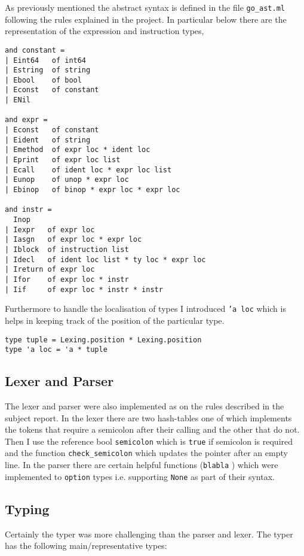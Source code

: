 \documentclass{article}
\begin{document}
As previously mentioned the abstract syntax is defined in the file \texttt{go\_ast.ml} following the rules explained in the project. In particular below there are the representation of the expression and instruction types,

\begin{verbatim}
and constant = 
| Eint64   of int64
| Estring  of string
| Ebool    of bool
| Econst   of constant
| ENil

and expr =
| Econst   of constant
| Eident   of string
| Emethod  of expr loc * ident loc
| Eprint   of expr loc list
| Ecall    of ident loc * expr loc list
| Eunop    of unop * expr loc
| Ebinop   of binop * expr loc * expr loc

and instr =
  Inop
| Iexpr   of expr loc
| Iasgn   of expr loc * expr loc
| Iblock  of instruction list
| Idecl   of ident loc list * ty loc * expr loc
| Ireturn of expr loc
| Ifor    of expr loc * instr
| Iif     of expr loc * instr * instr
\end{verbatim}
Furthermore to handle the localisation of types I introduced \texttt{'a loc} which is helps in keeping track of the position of the particular type.
\begin{verbatim}
type tuple = Lexing.position * Lexing.position
type 'a loc = 'a * tuple
\end{verbatim}

\subsection{Lexer and Parser}

The lexer and parser were also implemented as on the rules described in the subject report. 
In the lexer there are two hash-tables one of which implements the tokens that require a semicolon after their calling and the other that do not. Then I use the reference bool \texttt{semicolon} which is \texttt{true} if semicolon is required and the function \texttt{check\_semicolon} which updates the pointer after an empty line. 
In the parser there are certain helpful functions (\texttt{blabla} ) which were implemented to \texttt{option} types i.e. supporting \texttt{None} as part of their syntax. 

\subsection{Typing}

Certainly the typer was more challenging than the parser and lexer. The typer has the following main/representative types:
\end{document}
